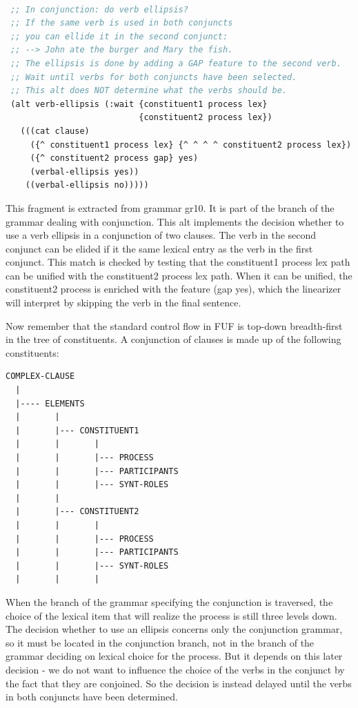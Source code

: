 \documentclass[10pt,a4paper]{report}
\begin{document}
\begin{lstlisting}[language=Lisp]

 ;; In conjunction: do verb ellipsis?
 ;; If the same verb is used in both conjuncts
 ;; you can ellide it in the second conjunct:
 ;; --> John ate the burger and Mary the fish.
 ;; The ellipsis is done by adding a GAP feature to the second verb.
 ;; Wait until verbs for both conjuncts have been selected. 
 ;; This alt does NOT determine what the verbs should be. 
 (alt verb-ellipsis (:wait {constituent1 process lex}
                           {constituent2 process lex})
   (((cat clause)
     ({^ constituent1 process lex} {^ ^ ^ ^ constituent2 process lex})
     ({^ constituent2 process gap} yes)
     (verbal-ellipsis yes))
    ((verbal-ellipsis no)))))

\end{lstlisting}


This fragment is extracted from grammar gr10.  It is part of the branch
of the grammar dealing with conjunction.  This alt implements the decision
whether to use a verb ellipsis in a conjunction of two clauses.  The verb
in the second conjunct can be elided if it the same lexical entry as the
verb in the first conjunct.  This match is checked by testing that the
{constituent1 process lex} path can be unified with the {constituent2
process lex} path.  When it can be unified, the {constituent2 process} is
enriched with the feature (gap yes), which the linearizer will interpret by
skipping the verb in the final sentence.

Now remember that the standard control flow in FUF is top-down
breadth-first in the tree of constituents.  A conjunction of clauses is
made up of the following constituents:

\begin{lstlisting}[language=Lisp]
COMPLEX-CLAUSE
  |
  |---- ELEMENTS 
  |       |
  |       |--- CONSTITUENT1 
  |       |       |
  |       |       |--- PROCESS
  |       |       |--- PARTICIPANTS
  |       |       |--- SYNT-ROLES
  |       |
  |       |--- CONSTITUENT2
  |       |       |
  |       |       |--- PROCESS
  |       |       |--- PARTICIPANTS
  |       |       |--- SYNT-ROLES
  |       |       |
\end{lstlisting}

When the branch of the grammar specifying the conjunction is traversed, the
choice of the lexical item that will realize the process is still three
levels down.  The decision whether to use an ellipsis concerns only the
conjunction grammar, so it must be located in the conjunction branch, not
in the branch of the grammar deciding on lexical choice for the process.  
But it depends on this later decision - we do not want to influence the
choice of the verbs in the conjunct by the fact that they are conjoined.
So the decision is instead delayed until the verbs in both conjuncts have
been determined.  
\end{document}
